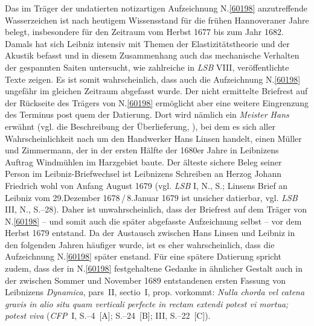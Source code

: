 \begin{ledgroup}%
\footnotesize%
\pstart%
\noindent%
%
Das im Träger der undatierten notizartigen Aufzeichnung N.\;\ref{60198} anzutreffende Wasserzeichen ist nach heutigem Wissensstand für die frühen Hannoveraner Jahre belegt, insbesondere für den Zeitraum vom Herbst 1677 bis zum Jahr 1682. %
Damals hat sich Leibniz intensiv mit Themen der Elastizitätstheorie und der Akustik befasst und in diesem Zusammenhang auch das mechanische Verhalten der gespannten Saiten untersucht, wie zahlreiche in \textit{LSB} VIII, veröffentlichte Texte zeigen.
Es ist somit wahrscheinlich, dass auch die Aufzeichnung N.\;\ref{60198} ungefähr im gleichen Zeitraum abgefasst wurde. %
\pend%
\pstart%
Der nicht ermittelte Briefrest auf der Rückseite des Trägers von N.\;\ref{60198} ermöglicht aber eine weitere Eingrenzung des Terminus post quem der Datierung.
Dort wird nämlich ein \textit{Meister Hans} erwähnt (vgl. die Beschreibung der Überlieferung, ), bei dem es sich aller Wahrscheinlichkeit nach um den Handwerker Hans Linsen handelt, einen Müller und Zimmermann, der in der ersten Hälfte der 1680er Jahre in Leibnizens Auftrag Windmühlen im Harzgebiet baute.
Der älteste sichere Beleg seiner Person im Leibniz-Briefwechsel ist Leibnizens Schreiben an Herzog Johann Friedrich wohl von Anfang August 1679 (vgl. \textit{LSB} I, N.,\cite{02614} S.; Linsens Brief an Leibniz vom 29.\;Dezember 1678\,/\,8.\;Januar 1679 ist unsicher datierbar, vgl. \textit{LSB} III, N.,\cite{02613} S.--28).
Daher ist unwahrscheinlich, dass der Briefrest auf dem Träger von N.\;\ref{60198} -- und somit auch die später abgefasste Aufzeichnung selbst -- vor dem Herbst 1679 entstand.
Da der Austausch zwischen Hans Linsen und Leibniz in den folgenden Jahren häufiger wurde, ist es eher wahrscheinlich, dass die Aufzeichnung N.\;\ref{60198} später enstand.
\pend%
\pstart%
Für eine spätere Datierung spricht zudem, dass der in N.\;\ref{60198} festgehaltene Gedanke in ähnlicher Gestalt auch in der zwischen Sommer und November 1689 entstandenen ersten Fassung von Leibnizens \textit{Dynamica}, pars~II, sectio~I, prop. vorkommt: %
\textit{Nulla chorda vel catena gravis in alio situ quam verticali perfecte in rectam extendi potest vi mortua; potest viva} (\textit{CFP}~I, S.--4~[A]; S.--24~[B]; III, S.--22~[C]).\cite{01354}

\end{ledgroup}
